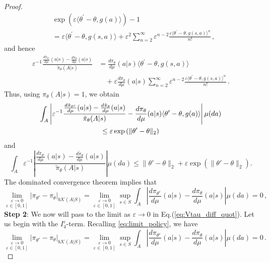 \documentclass{amsart}
\theoremstyle{definition}
\begin{document}
\begin{proof}
\begin{align*}
& \exp\left(\varepsilon\langle\theta^\prime - \theta, g(a)\rangle\right)-1\\
& = \varepsilon\langle\theta^\prime - \theta, g(s,a)\rangle + \varepsilon^2\sum_{n=2}^\infty\varepsilon^{n-2} \frac{\varepsilon\langle\theta^\prime - \theta, g(s,a)\rangle^n}{n!}\,,
\end{align*}
and hence
\begin{equation}
\begin{aligned}\label{ineq:ratio_diff_pol_eps}
\varepsilon^{-1}\frac{\frac{d\tilde{\pi}_{\theta^{\varepsilon}}}{d\mu}(a|s)-\frac{d\tilde{\pi}_{\theta}}{d\mu}(a|s)}{\tilde{\pi}_{\theta}(A|s)}&= \frac{d\pi_{\theta}}{d\mu}(a|s)\langle\theta^\prime - \theta, g(s,a)\rangle\\
&\quad +\varepsilon \frac{d\pi_{\theta}}{d\mu}(a|s) \sum_{n=2}^\infty \varepsilon^{n-2}\frac{\varepsilon\langle\theta^\prime - \theta, g(s,a)\rangle^n}{n!}\,.
\end{aligned}
\end{equation}
Thus, using $\pi_{\theta}(A|s)=1$, we obtain
\begin{gather*}
\int_{A}\left|\varepsilon^{-1}\frac{\frac{d\tilde{\pi}_{\theta^{\varepsilon}}}{d\mu}(a|s)-\frac{d\tilde{\pi}_{\theta}}{d\mu}(a|s)}{\tilde{\pi}_{\theta}(A|s)}- \frac{d\pi_{\theta}}{d\mu}(a|s)\langle\theta^\prime - \theta, g(a)\rangle\right|\mu(da)\notag\\
\le  \varepsilon\exp\left(\|\theta'-\theta\|_2\right)
\end{gather*}
and 
\[
\int_{A}\varepsilon^{-1}\left|\frac{\frac{d\tilde{\pi}_{\theta^{\varepsilon}}}{d\mu}(a|s)-\frac{d\tilde{\pi}_{\theta}}{d\mu}(a|s)}{\tilde{\pi}_{\theta}(A|s)}\right|\mu(da) \le \|\theta'-\theta\|_{2}+\varepsilon \exp\left(\|\theta'-\theta\|_{2}\right).
\]
The dominated convergence theorem implies that 
\begin{equation*}
\underset{\varepsilon \in [0,1]}{\lim_{\varepsilon\rightarrow 0}}|\pi_{\theta^{\varepsilon}}-\pi_{\theta}|_{b\mathcal{K}(A|S)}=\underset{\varepsilon \in [0,1]}{\lim_{\varepsilon\rightarrow 0}}\sup_{s\in S}\int_{A}\left|\frac{d\pi_{\theta^{\varepsilon}}}{d\mu}(a|s)-\frac{d\pi_{\theta}}{d\mu}(a|s)\right|\mu(da)=0\,,
\end{equation*}
\textbf{Step 2}: We now will pass to the limit as $\varepsilon\rightarrow 0$ in Eq.(\ref{eq:Vtau_diff_quot}). 
Let us begin with the $I_4^{\varepsilon}$-term. Recalling \eqref{eq:limit_policy}, we have
\begin{equation}\label{eq:limit_policy_again}
\underset{\varepsilon \in [0,1]}{\lim_{\varepsilon\rightarrow 0}}|\pi_{\theta^{\varepsilon}}-\pi_{\theta}|_{b\mathcal{K}(A|S)}=\underset{\varepsilon \in [0,1]}{\lim_{\varepsilon\rightarrow 0}}\sup_{s\in S}\int_{A}\left|\frac{d\pi_{\theta^{\varepsilon}}}{d\mu}(a|s)-\frac{d\pi_{\theta}}{d\mu}(a|s)\right|\mu(da)=0\,.

\end{equation}
\end{proof}
\end{document}
